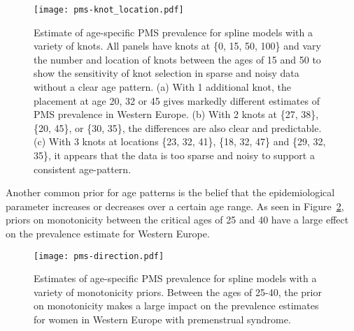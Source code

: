     \begin{figure}
        \begin{center}
            \texttt{[image: pms-knot\_location.pdf]}
        \end{center}
        \caption[Estimate of age-specific PMS prevalence for spline
          models with a variety of knots]{Estimate of age-specific PMS
          prevalence for spline models with a variety of knots.  All
          panels have knots at \{0, 15, 50, 100\} and vary the number
          and location of knots between the ages of 15 and 50 to show
          the sensitivity of knot selection in sparse and noisy data
          without a clear age pattern. (a) With 1 additional knot, the
          placement at age 20, 32 or 45 gives markedly different
          estimates of PMS prevalence in Western Europe.  (b) With 2
          knots at \{27, 38\}, \{20, 45\}, or \{30, 35\}, the
          differences are also clear and predictable. (c) With 3 knots
          at locations \{23, 32, 41\}, \{18, 32, 47\} and \{29, 32,
          35\}, it appears that the data is too sparse and noisy to
          support a consistent age-pattern.}
        \label{fig:app-pms knot_loc}
    \end{figure}

Another common prior for age patterns is the belief that the
epidemiological parameter increases or decreases over a certain age
range.  As seen in Figure~\ref{fig:app-pms dir}, priors on
monotonicity between the critical ages of 25 and 40 have a large
effect on the prevalence estimate for Western Europe.

    \begin{figure}
        \begin{center}
            \texttt{[image: pms-direction.pdf]}
        \end{center}
        \caption[Estimates of age-specific PMS prevalence for spline
          models with a variety of monotonicity priors]{Estimates of
          age-specific PMS prevalence for spline models with a variety
          of monotonicity priors. Between the ages of 25-40, the prior
          on monotonicity makes a large impact on the prevalence
          estimates for women in Western Europe with premenstrual
          syndrome.}
        \label{fig:app-pms dir}
    \end{figure}

